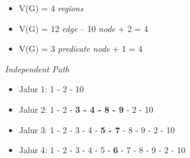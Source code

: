 \begin{itemize}
\item V(G) = 4 \emph{regions}
\item V(G) = 12 \emph{edge} – 10 \emph{node} + 2 = 4
\item V(G) = 3 \emph{predicate node} + 1 = 4
\end{itemize}

\noindent
\emph{Independent Path}

\begin{itemize}
\item Jalur 1: 1 - 2 - 10
\item Jalur 2: 1 - 2 - \textbf{3 - 4 - 8 - 9} - 2 - 10
\item Jalur 3: 1 - 2 - 3 - 4 - \textbf{5 - 7} - 8 - 9 - 2 - 10
\item Jalur 4: 1 - 2 - 3 - 4 - 5 - \textbf{6} - 7 - 8 - 9 - 2 - 10
\end{itemize}

